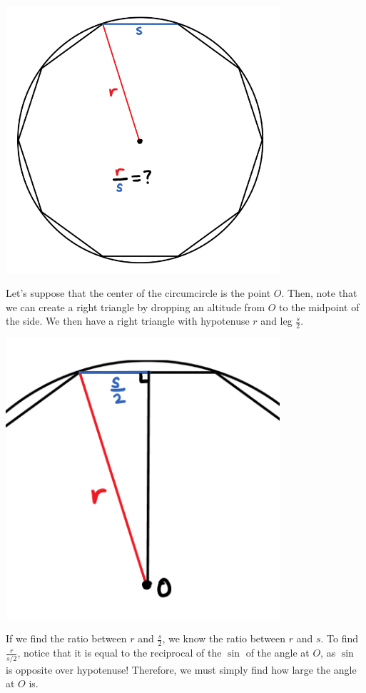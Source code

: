 \documentclass{article}
\begin{document}
\begin{center}
    \includegraphics[width=4in]{images/golden-ratio3.png}
\end{center}

Let’s suppose that the center of the circumcircle is the point $O$. Then, note that we can create a right triangle by dropping an altitude from $O$ to the midpoint of the side. We then have a right triangle with hypotenuse $r$ and leg $\frac s2$.

\begin{center}
   \includegraphics[width=4in]{images/golden-ratio4.png}
\end{center}

If we find the ratio between $r$ and $\frac{s}{2}$, we know the ratio between $r$ and $s$. To find $\frac{r}{s/2}$, notice that it is equal to the reciprocal of the $\sin$ of the angle at $O$, as $\sin$ is opposite over hypotenuse! Therefore, we must simply find how large the angle at $O$ is.
\end{document}
